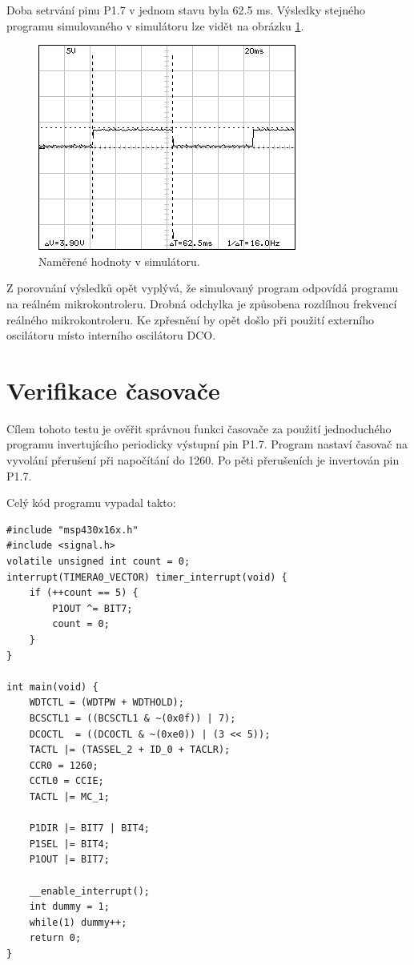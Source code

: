 Doba setrvání pinu P1.7 v jednom stavu byla 62.5 ms. Výsledky stejného programu simulovaného v simulátoru lze vidět na obrázku \ref{fig:dso05sim}.

\begin{figure}[ht]
\centering
\includegraphics[trim=0cm 0cm 0cm 0cm, scale=1]{fig/dso05}
\caption{Naměřené hodnoty v simulátoru.}
\label{fig:dso05sim}
\end{figure}

Z porovnání výsledků opět vyplývá, že simulovaný program odpovídá programu na reálném mikrokontroleru. Drobná odchylka je způsobena rozdílnou frekvencí reálného mikrokontroleru. Ke zpřesnění by opět došlo při použití externího oscilátoru místo interního oscilátoru DCO.

\section{Verifikace časovače}

Cílem tohoto testu je ověřit správnou funkci časovače za použití jednoduchého programu invertujícího periodicky výstupní pin P1.7. Program nastaví časovač na vyvolání přerušení při napočítání do 1260. Po pěti přerušeních je invertován pin P1.7.

Celý kód programu vypadal takto:

\lstset{language=XML, numbers=left, frame=single, breaklines=true, tabsize=2, xleftmargin=20pt}
\begin{lstlisting}
#include "msp430x16x.h"
#include <signal.h>
volatile unsigned int count = 0;
interrupt(TIMERA0_VECTOR) timer_interrupt(void) {
	if (++count == 5) {
		P1OUT ^= BIT7;
		count = 0;
	}
}

int main(void) {
	WDTCTL = (WDTPW + WDTHOLD);
	BCSCTL1 = ((BCSCTL1 & ~(0x0f)) | 7);
	DCOCTL  = ((DCOCTL & ~(0xe0)) | (3 << 5));
	TACTL |= (TASSEL_2 + ID_0 + TACLR);
	CCR0 = 1260;
	CCTL0 = CCIE;
	TACTL |= MC_1;

	P1DIR |= BIT7 | BIT4;
	P1SEL |= BIT4;
	P1OUT |= BIT7;

	__enable_interrupt();
	int dummy = 1;
	while(1) dummy++;
	return 0;
}

\end{lstlisting}

